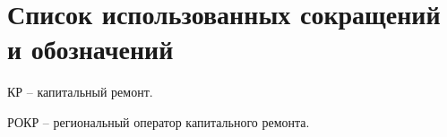 \section*{Список использованных сокращений и обозначений}

КР -- капитальный ремонт.

РОКР -- региональный оператор капитального ремонта.

\clearpage
\newpage
